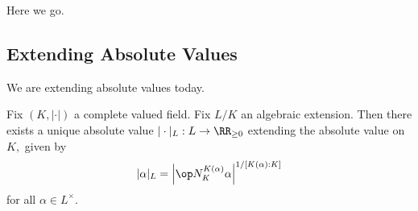 \documentclass[../notes.tex]{subfiles}
\begin{document}















Here we go.

\subsection{Extending Absolute Values}
We are extending absolute values today.
\begin{theorem}
	Fix $(K,|\cdot|)$ a complete valued field. Fix $L/K$ an algebraic extension. Then there exists a unique absolute value $|\cdot|_L:L\to\RR_{\ge0}$ extending the absolute value on $K,$ given by
	\[|\alpha|_L=\left|\op N_K^{K(\alpha)}\alpha\right|^{1/[K(\alpha):K]}\]
	for all $\alpha\in L^\times.$
\end{theorem}
\end{document}
